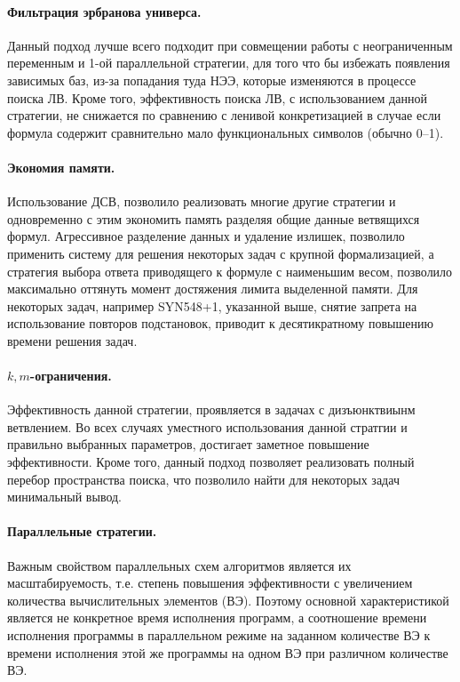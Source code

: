 \paragraph{Фильтрация эрбранова универса.} Данный подход лучше всего подходит при совмещении работы с неограниченным переменным и 1-ой параллельной стратегии, для того что бы избежать появления зависимых баз, из-за попадания туда НЭЭ, которые изменяются в процессе поиска ЛВ. Кроме того, эффективность поиска ЛВ, с использованием данной стратегии, не снижается по сравнению с ленивой конкретизацией в случае если формула содержит сравнительно мало функциональных символов (обычно 0--1).

\paragraph{Экономия памяти.}
Использование ДСВ, позволило реализовать многие другие стратегии и одновременно с этим экономить память разделяя общие данные ветвящихся формул. Агрессивное разделение данных и удаление излишек, позволило применить систему для решения некоторых задач с крупной формализацией, а стратегия выбора ответа приводящего к формуле с наименьшим весом, позволило максимально оттянуть момент достяжения лимита выделенной памяти. Для некоторых задач, например SYN548+1, указанной выше, снятие запрета на использование повторов подстановок, приводит к десятикратному повышению времени решения задач.

\paragraph{$k,m$-ограничения.}
Эффективность данной стратегии, проявляется в задачах с дизъюнктвиынм ветвлением. Во всех случаях уместного использования данной стратгии и правильно выбранных параметров, достигает заметное повышение эффективности. Кроме того, данный подход позволяет реализовать полный перебор пространства поиска, что позволило найти для некоторых задач минимальный вывод.

\paragraph{Параллельные стратегии.}
Важным свойством параллельных схем алгоритмов является их масштабируемость, т.е. степень повышения эффективности с увеличением количества вычислительных элементов (ВЭ). Поэтому основной характеристикой является не конкретное время исполнения программ, а соотношение времени исполнения программы в параллельном режиме на заданном количестве ВЭ к времени исполнения этой же программы на одном ВЭ при различном количестве ВЭ.


